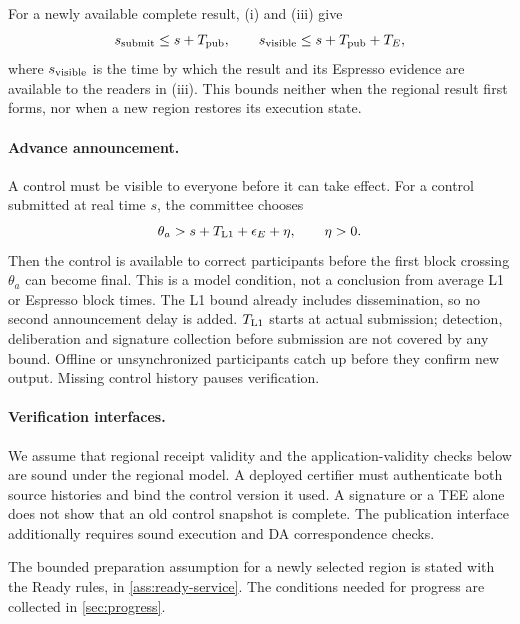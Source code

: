 \documentclass[11pt,a4paper]{article}
\begin{document}
For a newly available complete result, (i) and (iii) give
\[
 s_{\rm submit}\le s+T_{\rm pub},\qquad
 s_{\rm visible}\le s+T_{\rm pub}+T_E,
\]
where $s_{\rm visible}$ is the time by which the result and its Espresso
evidence are available to the readers in (iii). This bounds neither when
the regional result first forms, nor when a new region restores its
execution state.

\paragraph{Advance announcement.}
A control must be visible to everyone before it can take effect.
For a control submitted at real time $s$, the committee chooses
\[
 \theta_a>s+T_{\rm L1}+\epsilon_E+\eta,
 \qquad \eta>0.
\]
Then the control is available to correct participants before the first
block crossing $\theta_a$ can become final. This is a model condition,
not a conclusion from average L1 or Espresso block times. The L1 bound
already includes dissemination, so no second announcement delay is
added. $T_{\rm L1}$ starts at actual submission; detection, deliberation
and signature collection before submission are not covered by any
bound. Offline or unsynchronized participants catch up before they
confirm new output. Missing control history pauses verification.

\paragraph{Verification interfaces.}
We assume that regional receipt validity and the application-validity
checks below are sound under the regional model. A deployed certifier
must authenticate both source histories and bind the control version it
used. A signature or a TEE alone does not show that an old control
snapshot is complete. The publication interface additionally requires
sound execution and DA correspondence checks.

The bounded preparation assumption for a newly selected region is
stated with the Ready rules, in \cref{ass:ready-service}. The conditions
needed for progress are collected in \cref{sec:progress}.
\end{document}
